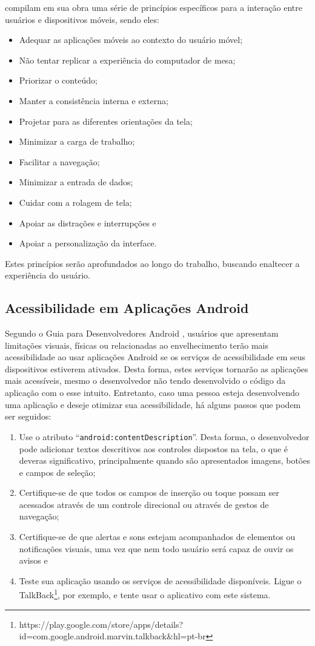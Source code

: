 \cite{ERGO2015} compilam em sua obra uma série de princípios específicos para a interação entre usuários e dispositivos móveis, sendo eles:
\begin{itemize}
	\item Adequar as aplicações móveis ao contexto do usuário móvel;
	\item Não tentar replicar a experiência do computador de mesa;
	\item Priorizar o conteúdo;
	\item Manter a consistência interna e externa;
	\item Projetar para as diferentes orientações da tela;
	\item Minimizar a carga de trabalho;
	\item Facilitar a navegação;
	\item Minimizar a entrada de dados;
	\item Cuidar com a rolagem de tela;
	\item Apoiar as distrações e interrupções e
	\item Apoiar a personalização da interface.
\end{itemize}
Estes princípios serão aprofundados ao longo do trabalho, buscando enaltecer a experiência do usuário.


\subsection{Acessibilidade em Aplicações Android}

Segundo o Guia para Desenvolvedores Android \cite{DEVACCESS2016}, usuários que apresentam limitações visuais, físicas ou relacionadas ao envelhecimento terão mais acessibilidade ao usar aplicações Android se os serviços de acessibilidade em seus dispositivos estiverem ativados. Desta forma, estes serviços tornarão as aplicações mais acessíveis, mesmo o desenvolvedor não tendo desenvolvido o código da aplicação com o esse intuito. Entretanto, caso uma pessoa esteja desenvolvendo uma aplicação e deseje otimizar sua acessibilidade, há alguns passos que podem ser seguidos:
\begin{enumerate}
	\item Use o atributo “\texttt{android:contentDescription}”. Desta forma, o desenvolvedor pode adicionar textos descritivos aos controles dispostos na tela, o que é deveras significativo, principalmente quando são apresentados imagens, botões e campos de seleção;
	\item Certifique-se de que todos os campos de inserção ou toque possam ser acessados através de um controle direcional ou através de gestos de navegação;
	\item Certifique-se de que alertas e sons estejam acompanhados de elementos ou notificações visuais, uma vez que nem todo usuário será capaz de ouvir os avisos e
	\item Teste sua aplicação usando os serviços de acessibilidade disponíveis. Ligue o TalkBack\footnote{https://play.google.com/store/apps/details?id=com.google.android.marvin.talkback\&hl=pt-br}, por exemplo, e tente usar o aplicativo com este sistema.
\end{enumerate}

